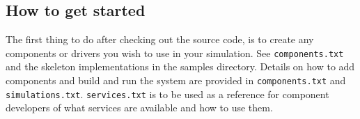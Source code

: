\subsection{How to get started}
\label{sec:getstarted}

\par The first thing to do after checking out the source code, is to create any 
components or drivers you wish to use in your simulation.  See 
\texttt{components.txt} and the skeleton implementations in the samples directory.  
Details on how to add components and build and run the system are provided 
in \texttt{components.txt} and \texttt{simulations.txt}.  \texttt{services.txt} is to be used as a 
reference for component developers of what services are available and how 
to use them.
